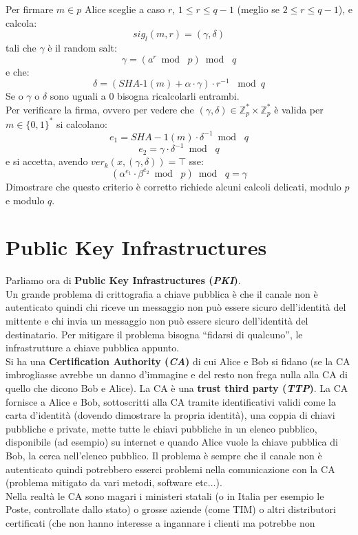 \documentclass[a4paper,12pt, oneside]{book}
\begin{document}
Per firmare $m\in p$ Alice sceglie a caso $r$, $1\leq r\leq q-1$ (meglio se
$2\leq r\leq q-1$), e calcola:
\[sig_l(m,r)=(\gamma,\delta)\]
tali che $\gamma$ è il random salt:
\[\gamma=(a^r\bmod\,\,p)\bmod\,\,q\]
e che:
\[\delta=(SHA\mbox{-}1(m)+\alpha\cdot\gamma)\cdot r^{-1}\,\,\bmod q\]
Se o $\gamma$ o $\delta$ sono uguali a 0 bisogna ricalcolarli entrambi.\\
Per verificare la firma, ovvero per vedere che $(\gamma,\delta)\in
\mathbb{Z}_p^*\times \mathbb{Z}_p^*$ è valida per $m\in\{0,1\}^*$ si calcolano:
\[e_1=SHA-1(m)\cdot \delta^{-1}\bmod\,\,q\]
\[e_2=\gamma\cdot \delta^{-1}\bmod\,\,q\]
e si accetta, avendo $ver_k(x,(\gamma,\delta))=\top$ sse:
\[(\alpha^{e_1}\cdot \beta^{e_2}\bmod\,\,p)\bmod\,\,q=\gamma\]
Dimostrare che questo criterio è corretto richiede alcuni calcoli
delicati, modulo $p$ e modulo $q$.
\section{Public Key Infrastructures}
Parliamo ora di \textbf{Public Key Infrastructures (\textit{PKI})}.\\
Un grande problema di crittografia a chiave pubblica è che il canale non è
autenticato quindi chi riceve un messaggio non può essere sicuro dell'identità
del mittente e chi invia un messaggio non può essere sicuro dell'identità del
destinatario. Per mitigare il problema bisogna ``fidarsi di qualcuno'', le
infrastrutture a chiave pubblica appunto. \\
Si ha una \textbf{Certification Authority (\textit{CA})} di cui Alice e Bob si
fidano (se la CA imbrogliasse avrebbe un danno d'immagine e del resto non frega
nulla alla CA di quello che dicono Bob e Alice). La CA è una \textbf{trust third
  party (\textit{TTP})}. La CA fornisce a Alice e Bob, sottoscritti alla CA
tramite identificativi validi come la carta d'identità (dovendo dimostrare la
propria identità), una coppia di chiavi
pubbliche e private, mette tutte le chiavi pubbliche in un elenco pubblico,
disponibile (ad esempio) su internet e quando Alice vuole la chiave pubblica di
Bob, la cerca nell'elenco pubblico. Il problema è sempre che il canale non è
autenticato quindi potrebbero esserci problemi nella comunicazione con la CA
(problema mitigato da vari metodi, software etc$\ldots$).\\
Nella realtà le CA sono magari i ministeri statali (o in Italia per esempio le
Poste, controllate dallo stato) o grosse aziende (come TIM) o altri distributori
certificati (che non hanno interesse a ingannare i clienti ma potrebbe non
\end{document}
